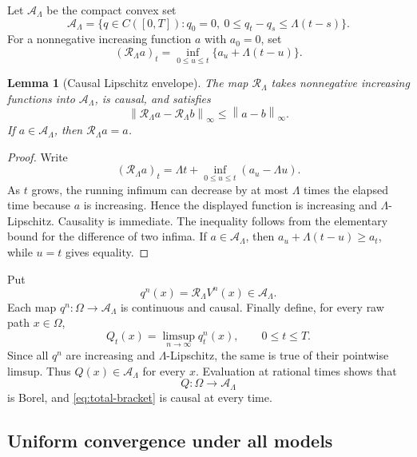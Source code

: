 \documentclass[11pt,reqno]{amsart}
\theoremstyle{plain}
\newtheorem{lemma}[lemma]{Lemma}
\theoremstyle{definition}
\newcommand{\cA}{\mathcal A}
\newcommand{\norm}[1]{\left\lVert #1\right\rVert}
\begin{document}
Let \(\cA_\Lambda\) be the compact convex set
\[
  \cA_\Lambda
  =
  \{q\in C([0,T]):q_0=0,\ 0\le q_t-q_s\le\Lambda(t-s)\}.
\]
For a nonnegative increasing function \(a\) with \(a_0=0\), set
\begin{equation}\label{eq:lipschitz-envelope}
  (\mathcal R_\Lambda a)_t
  =
  \inf_{0\le u\le t}
  \{a_u+\Lambda(t-u)\}.
\end{equation}

\begin{lemma}[Causal Lipschitz envelope]\label{lem:lipschitz-envelope}
The map \(\mathcal R_\Lambda\) takes nonnegative increasing functions into
\(\cA_\Lambda\), is causal, and satisfies
\[
  \norm{\mathcal R_\Lambda a-\mathcal R_\Lambda b}_\infty
  \le\norm{a-b}_\infty.
\]
If \(a\in\cA_\Lambda\), then \(\mathcal R_\Lambda a=a\).
\end{lemma}

\begin{proof}
Write
\[
  (\mathcal R_\Lambda a)_t
  =\Lambda t+\inf_{0\le u\le t}(a_u-\Lambda u).
\]
As \(t\) grows, the running infimum can decrease by at most
\(\Lambda\) times the elapsed time because \(a\) is increasing.  Hence the
displayed function is increasing and \(\Lambda\)-Lipschitz.  Causality is
immediate.  The inequality follows from the elementary bound for the
difference of two infima.  If \(a\in\cA_\Lambda\), then
\(a_u+\Lambda(t-u)\ge a_t\), while \(u=t\) gives equality.
\end{proof}

Put
\begin{equation}\label{eq:regularized-qv}
  q^n(x)
  =
  \mathcal R_\Lambda V^n(x)
  \in\cA_\Lambda.
\end{equation}
Each map \(q^n:\Omega\to\cA_\Lambda\) is continuous and causal.  Finally define,
for every raw path \(x\in\Omega\),
\begin{equation}\label{eq:total-bracket}
  Q_t(x)=\limsup_{n\to\infty}q_t^n(x),
  \qquad 0\le t\le T.
\end{equation}
Since all \(q^n\) are increasing and \(\Lambda\)-Lipschitz, the same is true
of their pointwise limsup.  Thus \(Q(x)\in\cA_\Lambda\) for every \(x\).
Evaluation at rational times shows that
\[
  Q:\Omega\longrightarrow\cA_\Lambda
\]
is Borel, and \eqref{eq:total-bracket} is causal at every time.

\subsection{Uniform convergence under all models}
\end{document}
